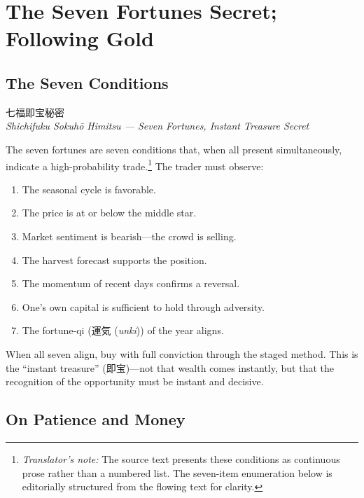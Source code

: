 \documentclass[10pt, openany]{book}
\newcommand{\jp}[1]{{\japanesefont #1}}
\newcommand{\tn}[1]{\footnote{\textit{Translator's note:} #1}}
\newcommand{\jt}[2]{\jp{#1} (\textit{#2})}
\begin{document}
\chapter{The Seven Fortunes Secret; Following Gold}

\section{The Seven Conditions}

\begin{center}
\jp{七福即宝秘密}\\
\textit{Shichifuku Sokuh\=o Himitsu --- Seven Fortunes, Instant Treasure Secret}
\end{center}

\vspace{0.5em}

The seven fortunes are seven conditions that, when all present
simultaneously, indicate a high-probability trade.\tn{The source text
presents these conditions as continuous prose rather than a numbered list.
The seven-item enumeration below is editorially structured from the
flowing text for clarity.} The trader must observe:

\begin{enumerate}[leftmargin=2em]
\item The seasonal cycle is favorable.
\item The price is at or below the middle star.
\item Market sentiment is bearish---the crowd is selling.
\item The harvest forecast supports the position.
\item The momentum of recent days confirms a reversal.
\item One's own capital is sufficient to hold through adversity.
\item The fortune-qi (\jt{運気}{unki}) of the year aligns.
\end{enumerate}

When all seven align, buy with full conviction through the staged method.
This is the ``instant treasure'' (\jp{即宝})---not that wealth comes
instantly, but that the recognition of the opportunity must be instant and
decisive.

\section{On Patience and Money}
\end{document}
